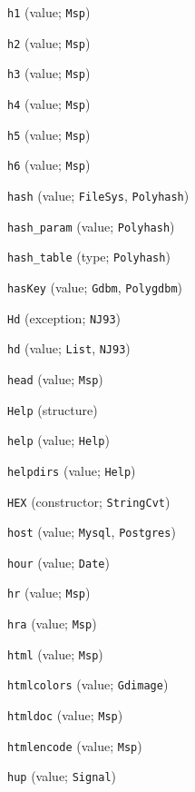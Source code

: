 \begin{description}
\item[] \verb"h1" (value; \verb"Msp")
\item[] \verb"h2" (value; \verb"Msp")
\item[] \verb"h3" (value; \verb"Msp")
\item[] \verb"h4" (value; \verb"Msp")
\item[] \verb"h5" (value; \verb"Msp")
\item[] \verb"h6" (value; \verb"Msp")
\item[] \verb"hash" (value; \verb"FileSys", \verb"Polyhash")
\item[] \verb"hash_param" (value; \verb"Polyhash")
\item[] \verb"hash_table" (type; \verb"Polyhash")
\item[] \verb"hasKey" (value; \verb"Gdbm", \verb"Polygdbm")
\item[] \verb"Hd" (exception; \verb"NJ93")
\item[] \verb"hd" (value; \verb"List", \verb"NJ93")
\item[] \verb"head" (value; \verb"Msp")
\item[] \verb"Help" (structure)
\item[] \verb"help" (value; \verb"Help")
\item[] \verb"helpdirs" (value; \verb"Help")
\item[] \verb"HEX" (constructor; \verb"StringCvt")
\item[] \verb"host" (value; \verb"Mysql", \verb"Postgres")
\item[] \verb"hour" (value; \verb"Date")
\item[] \verb"hr" (value; \verb"Msp")
\item[] \verb"hra" (value; \verb"Msp")
\item[] \verb"html" (value; \verb"Msp")
\item[] \verb"htmlcolors" (value; \verb"Gdimage")
\item[] \verb"htmldoc" (value; \verb"Msp")
\item[] \verb"htmlencode" (value; \verb"Msp")
\item[] \verb"hup" (value; \verb"Signal")
\\[2ex]


\end{description}
